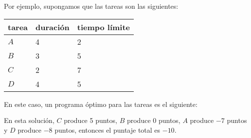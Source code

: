 Por ejemplo, supongamos que las tareas son las siguientes:
\begin{center}
\begin{tabular}{lll}
tarea & duración & tiempo límite \\
\hline
$A$ & 4 & 2 \\
$B$ & 3 & 5 \\
$C$ & 2 & 7 \\
$D$ & 4 & 5 \\
\end{tabular}
\end{center}
En este caso, un programa óptimo para las tareas
es el siguiente:
\begin{center}
\end{center}
En esta solución, $C$ produce 5 puntos,
$B$ produce 0 puntos, $A$ produce $-7$ puntos
y $D$ produce $-8$ puntos,
entonces el puntaje total es $-10$.

